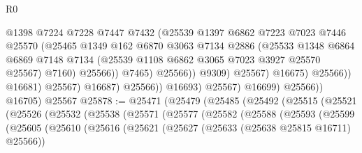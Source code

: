 \begin{lexlean}{R0}
\begin{coremodule}
                                          @1398
                                          @7224
                                          @7228
                                          @7447
                                          @7432
                                          (@25539
                                            @1397
                                            @6862
                                            @7223
                                            @7023
                                            @7446
                                            @25570
                                            (@25465
                                              @1349
                                              @162
                                              @6870
                                              @3063
                                              @7134
                                              @2886
                                              (@25533
                                                @1348
                                                @6864
                                                @6869
                                                @7148
                                                @7134
                                                (@25539 @1108 @6862 @3065 @7023 @3927 @25570 @25567)
                                                @7160)
                                              @25566))
                                          @7465)
                                        @25566))
                                    @9309)
                                  @25567)
                                @16675)
                              @25566))
                          @16681)
                        @25567)
                      @16687)
                    @25566))
                @16693)
              @25567)
            @16699)
          @25566))
      @16705)
    @25567
@25878 := @25471
    (@25479
      (@25485
        (@25492
          (@25515
            (@25521
              (@25526
                (@25532
                  (@25538
                    (@25571
                      (@25577
                        (@25582
                          (@25588
                            (@25593
                              (@25599
                                (@25605
                                  (@25610
                                    (@25616
                                      (@25621
                                        (@25627 (@25633 (@25638 @25815 @16711) @25566))

\end{coremodule}
\end{lexlean}

